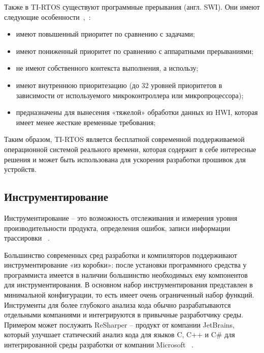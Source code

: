Также в TI-RTOS существуют программные прерывания (англ. SWI). Они имеют следующие
особенности~\cite{ma_tirtos_kernel},~\cite{tirtos_sysbios_user_guide}:
\begin{itemize}
    \item имеют повышенный приоритет по сравнению с задачами;
    \item имеют пониженный приоритет по сравнению с аппаратными прерываниями;
    \item не имеют собственного контекста выполнения, а использу;
    \item имеют внутреннюю приоритезацию (до 32 уровней приоритетов в зависимости
    от используемого микроконтроллера или микропроцессора);
    \item предназначены для вынесения «тяжелой» обработки данных из HWI,
        которая имеет менее жесткие временные требования;
\end{itemize}

Таким образом, TI-RTOS является бесплатной современной поддерживаемой
операционной системой реального времени, которая содержит в себе интересные решения
и может быть использована для ускорения разработки прошивок для устройств.


\subsection{Инструментирование}

Инструментирование -- это возможность отслеживания и измерения уровня
производительности продукта, определения ошибок, записи информации
трассировки ~\cite{instrumentation_site}.

Большинство современных сред разработки и компиляторов поддерживают
инструментирование «из коробки»: после установки программного средства
у программиста имеется в наличии большинство необходимых ему компонентов
для инструментирования. В основном набор инструментирования представлен в
минимальной конфигурации, то есть имеет очень ограниченный набор функций.
Инструменты для более глубокого анализа кода обычно разрабатываются отдельными
компаниями и интегрируются в привычные разработчику среды. Примером может
послужить ReSharper -- продукт от компании JetBrains, который улучшает
статический анализ кода для языков C, C++ и C\# для интегрированной среды
разработки от компании Microsoft ~\cite{resharper_site}.

